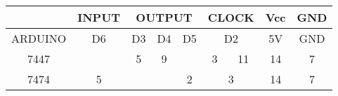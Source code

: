 \begin{tabular}{|c|c|c|c|c|c|c|c|c|}
        \hline & INPUT & \multicolumn{3}{|c|}{OUTPUT} & \multicolumn{2}{|c|}{CLOCK} & Vcc & GND \\
        \hline ARDUINO & D6 & D3 & D4 & D5 & \multicolumn{2}{|c|}{D2} & 5V & GND \\
        \hline 7447 && 5 & 9 && 3 & 11 & 14 & 7 \\
        \hline 7474 & 5 &&& 2 & \multicolumn{2}{|c|}{3} & 14 & 7 \\
        \hline
    \end{tabular}
